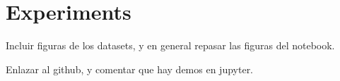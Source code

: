 %
%

\chapter{Experiments}\label{ch:experiments}



\begin{outcomment}
  Incluir figuras de los datasets, y en general repasar las figuras del notebook.

  Enlazar al github, y comentar que hay demos en jupyter.
\end{outcomment}
